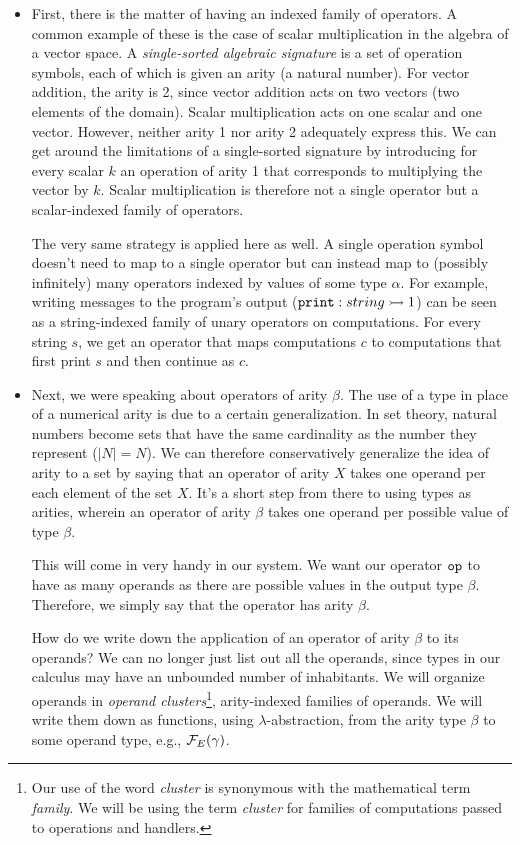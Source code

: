 \begin{itemize}
\item First, there is the matter of having an indexed family of
  operators. A common example of these is the case of scalar multiplication
  in the algebra of a vector space. A \emph{single-sorted algebraic
    signature} is a set of operation symbols, each of which is given an
  arity (a natural number). For vector addition, the arity is 2, since
  vector addition acts on two vectors (two elements of the
  domain). Scalar multiplication acts on one scalar and one
  vector. However, neither arity 1 nor arity 2 adequately express this. We
  can get around the limitations of a single-sorted signature by
  introducing for every scalar $k$ an operation of arity 1 that corresponds
  to multiplying the vector by $k$. Scalar multiplication is therefore not
  a single operator but a scalar-indexed family of operators.

  The very same strategy is applied here as well. A single operation symbol
  doesn't need to map to a single operator but can instead map to (possibly
  infinitely) many operators indexed by values of some type $\alpha$. For
  example, writing messages to the program's output
  ($\mathtt{print} : string \rightarrowtail 1$) can be seen as a string-indexed family of
  unary operators on computations. For every string $s$, we get an operator
  that maps computations $c$ to computations that first print $s$ and then
  continue as $c$.

\item Next, we were speaking about operators of arity $\beta$. The use of a
  type in place of a numerical arity is due to a certain generalization. In
  set theory, natural numbers become sets that have the same cardinality as
  the number they represent ($\left\vert N \right\vert = N$). We can
  therefore conservatively generalize the idea of arity to a set by saying
  that an operator of arity $X$ takes one operand per each element of the
  set $X$. It's a short step from there to using types as arities, wherein
  an operator of arity $\beta$ takes one operand per possible value of type
  $\beta$.

  This will come in very handy in our system. We want our operator
  $\mathtt{op}$ to have as many operands as there are possible values in the
  output type $\beta$. Therefore, we simply say that the operator has arity
  $\beta$.

  How do we write down the application of an operator of arity $\beta$ to
  its operands? We can no longer just list out all the operands, since
  types in our calculus may have an unbounded number of inhabitants. We
  will organize operands in \emph{operand clusters}\footnote{Our use of the
  word \emph{cluster} is synonymous with the mathematical term
  \emph{family}. We will be using the term \emph{cluster} for families of
  computations passed to operations and handlers.}, arity-indexed families
  of operands. We will write them down as functions, using
  $\lambda$-abstraction, from the arity type $\beta$ to some operand type,
  e.g., $\mathcal{F}_E(\gamma)$.
\end{itemize}

